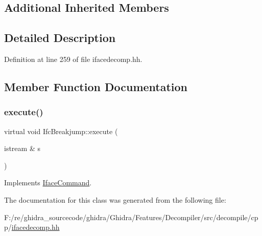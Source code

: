 \subsection*{Additional Inherited Members}


\subsection{Detailed Description}


Definition at line 259 of file ifacedecomp.\+hh.



\subsection{Member Function Documentation}
\mbox{\label{class_ifc_breakjump_a5e19adee37bf69024ce3f6d0e8fdf30a}} 
\subsubsection{\texorpdfstring{execute()}{execute()}}
{\footnotesize\ttfamily virtual void Ifc\+Breakjump\+::execute (\begin{DoxyParamCaption}\item[{istream \&}]{s }\end{DoxyParamCaption})\hspace{0.3cm}{\ttfamily [virtual]}}



Implements \mbox{\hyperlink{class_iface_command_af10e29cee2c8e419de6efe9e680ad201}{Iface\+Command}}.



The documentation for this class was generated from the following file\+:\begin{DoxyCompactItemize}
\item 
F\+:/re/ghidra\+\_\+sourcecode/ghidra/\+Ghidra/\+Features/\+Decompiler/src/decompile/cpp/\mbox{\hyperlink{ifacedecomp_8hh}{ifacedecomp.\+hh}}\end{DoxyCompactItemize}
